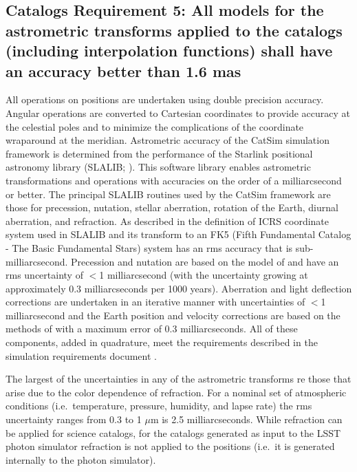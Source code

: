 \documentclass[]{article}
\begin{document}
{\subsection{Catalogs Requirement 5: All models for the astrometric transforms applied to the catalogs (including interpolation functions) 
shall have an accuracy better than 1.6 mas}
All operations on positions are undertaken using double precision accuracy. Angular operations are converted to Cartesian coordinates to provide accuracy at the celestial poles and to minimize the complications of the coordinate wraparound at the meridian. Astrometric accuracy of the CatSim simulation framework is determined from the performance of the Starlink positional astronomy library (SLALIB; \citet{wallace}). This software library enables astrometric transformations and operations with
accuracies on the order of a milliarcsecond or better.  The principal SLALIB routines used by the CatSim framework are those for precession, nutation, stellar aberration, rotation of the Earth, diurnal aberration, and refraction.  As described in \citet{wallace} the definition of ICRS coordinate system used in SLALIB and its transform to an FK5 (Fifth Fundamental Catalog - The Basic Fundamental Stars) system has an rms accuracy that is sub-milliarcsecond. Precession and nutation are based on the
model of \citet{SF2001} and have an rms uncertainty of $<$1 milliarcsecond (with the uncertainty growing at approximately 0.3 milliarcseconds per 1000 years). Aberration and light deflection corrections are undertaken in an iterative manner with uncertainties of $<$1 milliarcsecond and the Earth position and velocity corrections are based on the methods of \citep{stumpff} with a maximum error of 0.3 milliarcseconds. All of these components, added in quadrature, meet the requirements described
in the simulation requirements document \citet{requirements}.

The largest of the uncertainties in any of the astrometric transforms  re those that arise due to the color dependence of refraction. For a nominal set of atmospheric conditions (i.e.\ temperature, pressure, humidity, and lapse rate) the rms uncertainty ranges from 0.3 to 1 $\mu$m is 2.5 milliarcseconds. While refraction can be applied for science catalogs, for the catalogs generated as input to the LSST photon simulator refraction is not applied to the positions (i.e.\ it is generated internally to the photon
simulator).
}
\end{document}
